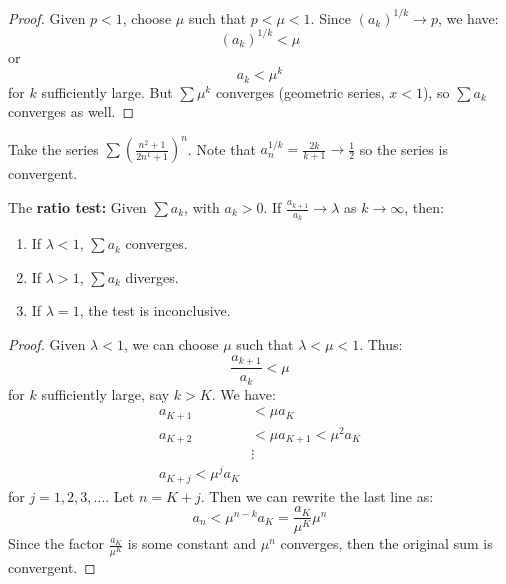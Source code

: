 \begin{itemize}
\begin{proof}
        Given $p<1$, choose $\mu$ such that $p<\mu<1$. Since $(a_k)^{1/k} \to p$, we have:
        \begin{equation}
            (a_k)^{1/k} < \mu
        \end{equation}
        or
        \begin{equation}
            a_k < \mu^k
        \end{equation}
        for $k$ sufficiently large. But $\sum \mu^k$ converges (geometric series, $x<1$), so $\sum a_k$ converges as well.
    \end{proof}
    \begin{example}
        Take the series $\sum \left(\frac{n^2+1}{2n^1+1}\right)^n$. Note that $a_n^{1/k}=\frac{2k}{k+1} \to \frac{1}{2}$ so the series is convergent.
    \end{example}
    \begin{theorem}
        The \textbf{ratio test:} Given $\sum a_k$, with $a_k>0$. If $\frac{a_{k+1}}{a_k}\to \lambda$ as $k\to\infty$, then:
        \begin{enumerate}
            \item If $\lambda < 1$, $\sum a_k$ converges.
            \item If $\lambda >1$, $\sum a_k$ diverges.
            \item If $\lambda = 1$, the test is inconclusive.
        \end{enumerate}
    \end{theorem}
    \begin{proof}
        Given $\lambda < 1$, we can choose $\mu$ such that $\lambda < \mu < 1$. Thus:
        \begin{equation}
            \frac{a_{k+1}}{a_k}<\mu
        \end{equation}
        for $k$ sufficiently large, say $k>K$. We have:
        \begin{align}
            a_{K+1} &< \mu a_K \\
            a_{K+2} &< \mu a_{K+1} < \mu^2 a_{K} \\ 
            &\vdots \\ 
            a_{K+j} < \mu^j a_K
        \end{align}
        for $j=1,2,3,\dots$. Let $n=K+j$. Then we can rewrite the last line as:
        \begin{equation}
            a_n < \mu^{n-k}a_K = \frac{a_K}{\mu^K}\mu^n
        \end{equation}
        Since the factor $\frac{a_K}{\mu^K}$ is some constant and $\mu^n$ converges, then the original sum is convergent.

\end{proof}
\end{itemize}
